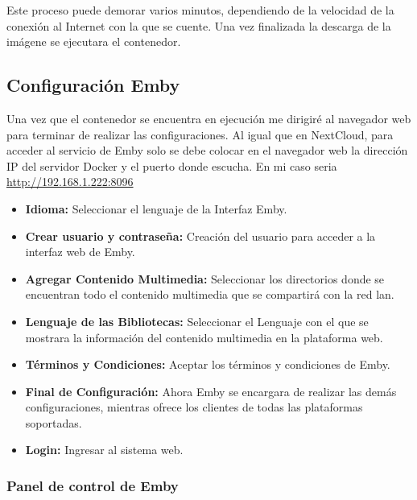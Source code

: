 			Este proceso puede demorar varios minutos, dependiendo de la velocidad de la conexión al Internet con la que se cuente. Una vez finalizada la descarga de la imágene se ejecutara el contenedor.\par
	
		\subsection{Configuración Emby}
					
			Una vez que el contenedor se encuentra en ejecución me dirigiré al navegador web para terminar de realizar las configuraciones. Al igual que en NextCloud, para acceder al servicio de Emby solo se debe colocar en el navegador web la dirección IP del servidor Docker y el puerto donde escucha. En mi caso seria \href{http://192.168.1.222:8096/}{\color{blue}http://192.168.1.222:8096}
			
			\begin{itemize}
				
				\item \textbf{Idioma:} Seleccionar el lenguaje de la Interfaz Emby.
				
				\item \textbf{Crear usuario y contraseña:} Creación del usuario para acceder a la interfaz web de Emby.
				
				\item \textbf{Agregar Contenido Multimedia:} Seleccionar los directorios donde se encuentran todo el contenido multimedia que se compartirá con la red lan.
				
				\item \textbf{Lenguaje de las Bibliotecas:} Seleccionar el Lenguaje con el que se mostrara la información del contenido multimedia en la plataforma web.
				
				\item \textbf{Términos y Condiciones:} Aceptar los términos y condiciones de Emby.
				
				\item \textbf{Final de Configuración:} Ahora Emby se encargara de realizar las demás configuraciones, mientras ofrece los clientes de todas las plataformas soportadas.
				
				\item \textbf{Login:} Ingresar al sistema web.
				
			\end{itemize}
		
			\subsubsection{Panel de control de Emby}
			
